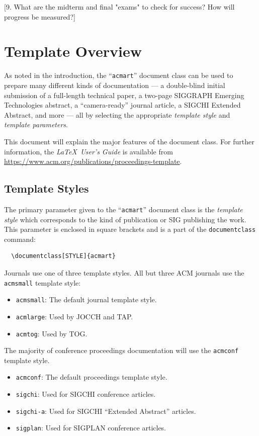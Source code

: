 \documentclass[sigconf,nonacm,11pt]{acmart}
\begin{document}
[9. What are the midterm and final "exams" to check for success? How will progress be measured?]\pagebreak


\section{Template Overview}
As noted in the introduction, the ``\verb|acmart|'' document class can
be used to prepare many different kinds of documentation --- a
double-blind initial submission of a full-length technical paper, a
two-page SIGGRAPH Emerging Technologies abstract, a ``camera-ready''
journal article, a SIGCHI Extended Abstract, and more --- all by
selecting the appropriate {\itshape template style} and {\itshape
  template parameters}.

This document will explain the major features of the document
class. For further information, the {\itshape \LaTeX\ User's Guide} is
available from
\url{https://www.acm.org/publications/proceedings-template}.

\subsection{Template Styles}

The primary parameter given to the ``\verb|acmart|'' document class is
the {\itshape template style} which corresponds to the kind of publication
or SIG publishing the work. This parameter is enclosed in square
brackets and is a part of the {\verb|documentclass|} command:
\begin{verbatim}
  \documentclass[STYLE]{acmart}
\end{verbatim}

Journals use one of three template styles. All but three ACM journals
use the {\verb|acmsmall|} template style:
\begin{itemize}
\item {\verb|acmsmall|}: The default journal template style.
\item {\verb|acmlarge|}: Used by JOCCH and TAP.
\item {\verb|acmtog|}: Used by TOG.
\end{itemize}

The majority of conference proceedings documentation will use the {\verb|acmconf|} template style.
\begin{itemize}
\item {\verb|acmconf|}: The default proceedings template style.
\item{\verb|sigchi|}: Used for SIGCHI conference articles.
\item{\verb|sigchi-a|}: Used for SIGCHI ``Extended Abstract'' articles.
\item{\verb|sigplan|}: Used for SIGPLAN conference articles.
\end{itemize}
\end{document}

